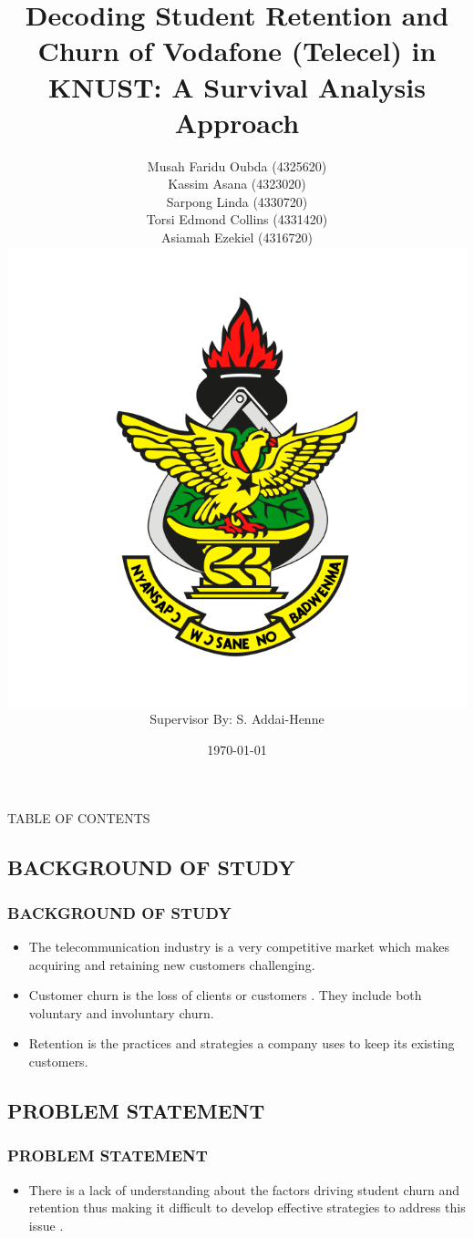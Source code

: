 \documentclass[12pt]{beamer}
\title[ KNUST]{\textbf{\small{Decoding Student Retention and Churn of Vodafone (Telecel) in KNUST: A Survival Analysis Approach}}}
\author[BSc. Actuarial Science]{
{\footnotesize{
Musah Faridu Oubda (4325620)\\ Kassim Asana     (4323020)\\ Sarpong Linda    (4330720) \\ Torsi Edmond Collins (4331420) \\ Asiamah Ezekiel (4316720)  }} \\[4mm] \includegraphics[scale=0.1]{logo.png} \\Supervisor By: S. Addai-Henne}
\institute
[COS]{ Kwame Nkrumah University Of Science And Technology, KNUST \\ Kumasi, Ghana}
\date[\tiny \today]{\scriptsize \today}
\begin{document}
	\begin{frame}
		\titlepage
	\end{frame}
	
	\begin{frame}{TABLE OF CONTENTS}
		\tableofcontents
	\end{frame}
		
	\begin{frame}
 	\section{BACKGROUND OF STUDY}
		\frametitle{BACKGROUND OF STUDY}
  		\begin{flushleft}

		\begin{itemize}
			\item 	The telecommunication industry is a very competitive market which makes acquiring and retaining new customers challenging.
   \vspace{0.3cm}

               \item Customer churn is the loss of clients or customers \cite{sterne2008}. They include both voluntary and involuntary churn.
               \vspace{0.3cm}
               \item   Retention is the practices and strategies a company uses to keep its existing customers.

   \end{itemize}
   		\end{flushleft}

    \end{frame}
	
	\begin{frame}
 		\section{PROBLEM STATEMENT}

		\frametitle{PROBLEM STATEMENT}
  \begin{itemize}
      \item There is a lack of understanding about the factors driving student churn and retention thus making it difficult to develop effective strategies to address this issue \cite{kapur2018}.
		
  \end{itemize}
     
	\end{frame}
	
\end{document}
